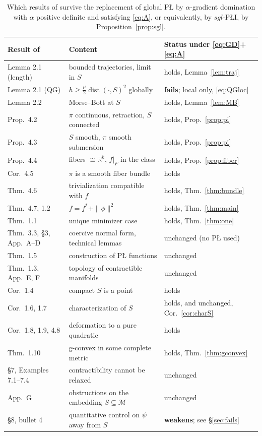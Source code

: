 \documentclass[11pt]{article}
\theoremstyle{plain}
\theoremstyle{definition}
\theoremstyle{remark}
\newcommand{\M}{\mathcal{M}}
\newcommand{\R}{\mathbb{R}}
\DeclareMathOperator{\dist}{dist}
\begin{document}
\begin{table}[hbtp]
\centering
\small
\begin{tabular}{lll}
\hline
Result of \cite{BCR2026} & Content & Status under \eqref{eq:GD}+\eqref{eq:A}\\
\hline
Lemma 2.1 (length) & bounded trajectories, limit in $S$ & holds, Lemma~\ref{lem:traj}\\
Lemma 2.1 (QG) & $h \ge \tfrac\mu2\dist(\cdot,S)^2$ globally & \textbf{fails}; local only, \eqref{eq:QGloc}\\
Lemma 2.2 & Morse--Bott at $S$ & holds, Lemma~\ref{lem:MB}\\
Prop.\ 4.2 & $\pi$ continuous, retraction, $S$ connected & holds, Prop.~\ref{prop:pi}\\
Prop.\ 4.3 & $S$ smooth, $\pi$ smooth submersion & holds, Prop.~\ref{prop:pi}\\
Prop.\ 4.4 & fibers $\cong\R^k$, $f|_F$ in the class & holds, Prop.~\ref{prop:fiber}\\
Cor.\ 4.5 & $\pi$ is a smooth fiber bundle & holds\\
Thm.\ 4.6 & trivialization compatible with $f$ & holds, Thm.~\ref{thm:bundle}\\
Thm.\ 4.7, 1.2 & $f = f^*+\|\phi\|^2$ & holds, Thm.~\ref{thm:main}\\
Thm.\ 1.1 & unique minimizer case & holds, Thm.~\ref{thm:one}\\
Thm.\ 3.3, \S3, App.\ A--D & coercive normal form, technical lemmas & unchanged (no P\L{} used)\\
Thm.\ 1.5 & construction of P\L{} functions & unchanged\\
Thm.\ 1.3, App.\ E, F & topology of contractible manifolds & unchanged\\
Cor.\ 1.4 & compact $S$ is a point & holds\\
Cor.\ 1.6, 1.7 & characterization of $S$ & holds, and unchanged, Cor.~\ref{cor:charS}\\
Cor.\ 1.8, 1.9, 4.8 & deformation to a pure quadratic & holds\\
Thm.\ 1.10 & g-convex in some complete metric & holds, Thm.~\ref{thm:gconvex}\\
\S7, Examples 7.1--7.4 & contractibility cannot be relaxed & unchanged\\
App.\ G & obstructions on the embedding $S\subseteq\M$ & unchanged\\
\hline
\S8, bullet 4 & quantitative control on $\psi$ away from $S$ & \textbf{weakens}; see \S\ref{sec:fails}\\
\hline
\end{tabular}
\caption{Which results of \cite{BCR2026} survive the replacement of global
P\L{} by $\alpha$-gradient domination with $\alpha$ positive definite and
satisfying \eqref{eq:A}, or equivalently, by $sgl$-P\L{}I, by
Proposition~\ref{prop:sgl}.}
\label{tab:status}
\end{table}
\end{document}
